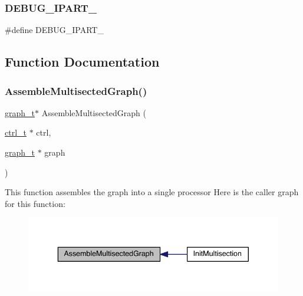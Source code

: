 \subsubsection{\texorpdfstring{D\+E\+B\+U\+G\+\_\+\+I\+P\+A\+R\+T\+\_\+}{DEBUG\_IPART\_}}
{\footnotesize\ttfamily \#define D\+E\+B\+U\+G\+\_\+\+I\+P\+A\+R\+T\+\_\+}



\subsection{Function Documentation}
\mbox{\label{a00365_aafb75eb581d7dd13903d8e5040dce30a}} 
\subsubsection{\texorpdfstring{Assemble\+Multisected\+Graph()}{AssembleMultisectedGraph()}}
{\footnotesize\ttfamily \hyperlink{a00734}{graph\+\_\+t}$\ast$ Assemble\+Multisected\+Graph (\begin{DoxyParamCaption}\item[{\hyperlink{a00742}{ctrl\+\_\+t} $\ast$}]{ctrl,  }\item[{\hyperlink{a00734}{graph\+\_\+t} $\ast$}]{graph }\end{DoxyParamCaption})}

This function assembles the graph into a single processor Here is the caller graph for this function\+:\nopagebreak
\begin{figure}[H]
\begin{center}
\leavevmode
\includegraphics[width=340pt]{a00365_aafb75eb581d7dd13903d8e5040dce30a_icgraph}
\end{center}
\end{figure}
\mbox{\label{a00365_ad2642ed6985ca20fc79c0a5b52c5424b}} 
